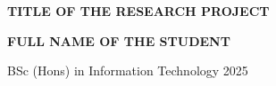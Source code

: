 \begin{center}\onehalfspacing
    \MakeUppercase{\textbf{\large TITLE OF THE RESEARCH PROJECT}}
    
    
    
    \vspace{3in}
    \MakeUppercase{ \textbf{FULL NAME OF THE STUDENT}}
    
    \vspace{5.7in}
    
    \large BSc (Hons) in Information Technology \hfill 2025

\end{center}